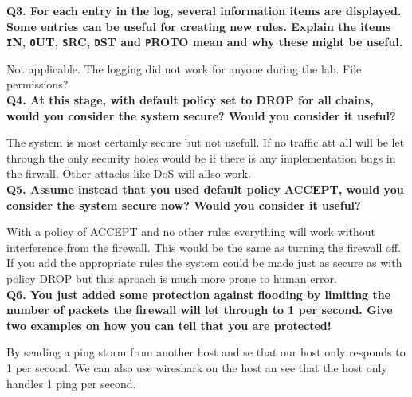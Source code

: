 \noindent \textbf{Q3. For each entry in the log, several information items are
displayed. Some entries can be useful for creating new rules. Explain the 
items {\texttt IN}, {\texttt OUT}, {\texttt SRC}, {\texttt DST} and {\texttt PROTO}
mean and why these might be useful.}
 
Not applicable. The logging did not work for anyone during the lab. File permissions?
\\

\noindent \textbf{Q4. At this stage, with default policy set to DROP for all 
chains, would you consider the system secure? Would you consider it useful?}

The system is most certainly secure but not usefull. If no traffic att all will
be let through the only security holes would be if there is any implementation 
bugs in the firwall. Other attacks like DoS will allso work. 
\\

\noindent \textbf{Q5. Assume instead that you used default policy ACCEPT, 
would you consider the system secure now? Would you consider it useful?}

With a policy of ACCEPT and no other rules everything will work without interference
from the firewall. This would be the same as turning the firewall off. If you add
the appropriate rules the system could be made just as secure as with policy DROP but
this aproach is much more prone to human error.
\\

\noindent \textbf{Q6. You just added some protection against flooding by 
limiting the number of packets the firewall will let through to 1 per second. 
Give two examples on how you can tell that you are protected!}

By sending a ping storm from another host and se that our host only responds to 1 per 
second. We can also use wireshark on the host an see that the host only handles 1 
ping per second.
